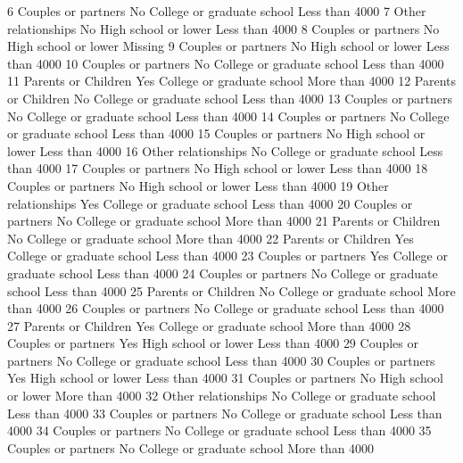 \documentclass[
  letterpaper,
  DIV=11,
  numbers=noendperiod]{scrreprt}
\newenvironment{Shaded}{\begin{snugshade}}{\end{snugshade}}
\newcommand{\NormalTok}[1]{\textcolor[rgb]{0.00,0.23,0.31}{#1}}
\begin{document}
\begin{Shaded}
\begin{Highlighting}[]
\NormalTok{6   Couples or partners       No College or graduate school Less than 4000}
\NormalTok{7   Other relationships       No       High school or lower Less than 4000}
\NormalTok{8   Couples or partners       No       High school or lower        Missing}
\NormalTok{9   Couples or partners       No       High school or lower Less than 4000}
\NormalTok{10  Couples or partners       No College or graduate school Less than 4000}
\NormalTok{11  Parents or Children      Yes College or graduate school More than 4000}
\NormalTok{12  Parents or Children       No College or graduate school Less than 4000}
\NormalTok{13  Couples or partners       No College or graduate school Less than 4000}
\NormalTok{14  Couples or partners       No College or graduate school Less than 4000}
\NormalTok{15  Couples or partners       No       High school or lower Less than 4000}
\NormalTok{16  Other relationships       No College or graduate school Less than 4000}
\NormalTok{17  Couples or partners       No       High school or lower Less than 4000}
\NormalTok{18  Couples or partners       No       High school or lower Less than 4000}
\NormalTok{19  Other relationships      Yes College or graduate school Less than 4000}
\NormalTok{20  Couples or partners       No College or graduate school More than 4000}
\NormalTok{21  Parents or Children       No College or graduate school More than 4000}
\NormalTok{22  Parents or Children      Yes College or graduate school Less than 4000}
\NormalTok{23  Couples or partners      Yes College or graduate school Less than 4000}
\NormalTok{24  Couples or partners       No College or graduate school Less than 4000}
\NormalTok{25  Parents or Children       No College or graduate school More than 4000}
\NormalTok{26  Couples or partners       No College or graduate school Less than 4000}
\NormalTok{27  Parents or Children      Yes College or graduate school More than 4000}
\NormalTok{28  Couples or partners      Yes       High school or lower Less than 4000}
\NormalTok{29  Couples or partners       No College or graduate school Less than 4000}
\NormalTok{30  Couples or partners      Yes       High school or lower Less than 4000}
\NormalTok{31  Couples or partners       No       High school or lower More than 4000}
\NormalTok{32  Other relationships       No College or graduate school Less than 4000}
\NormalTok{33  Couples or partners       No College or graduate school Less than 4000}
\NormalTok{34  Couples or partners       No College or graduate school Less than 4000}
\NormalTok{35  Couples or partners       No College or graduate school More than 4000}

\end{Highlighting}
\end{Shaded}
\end{document}
